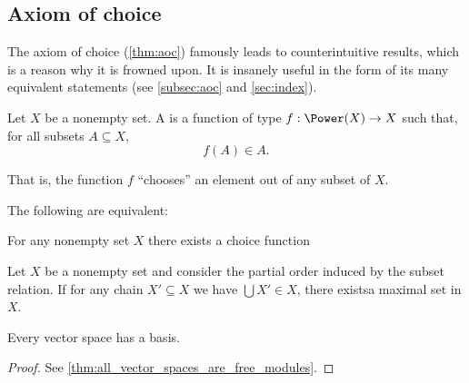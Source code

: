 \subsection{Axiom of choice}\label{subsec:axiom_of_choice}

\begin{remark}\label{remark:aoc}
  The axiom of choice (\cref{thm:aoc}) famously leads to counterintuitive results, which is a reason why it is frowned upon. It is insanely useful in the form of its many equivalent statements (see \cref{subsec:aoc} and \cref{sec:index}).
\end{remark}

\begin{definition}\label{def:choice_function}
  Let \( X \) be a nonempty set. A  is a function of type \( f: \Power(X) \to X \) such that, for all subsets \( A \subseteq X \),
  \begin{equation*}
    f(A) \in A.
  \end{equation*}

  That is, the function \( f \) \enquote{chooses} an element out of any subset of \( X \).
\end{definition}

\begin{theorem}\label{thm:aoc}
  The following are equivalent:

  \begin{thmenum}
    \cite[theorem 6M(3)]{Enderton1977} For any nonempty set \( X \) there exists a choice function

    \cite[theorem 6M(6)]{Enderton1977} Let \( X \) be a nonempty set and consider the partial order induced by the subset relation. If for any chain \( X' \subseteq X \) we have \( \bigcup X' \in X \), there exists\AOC a maximal set in \( X \).

     Every vector space has a basis.
  \end{thmenum}
\end{theorem}
\begin{proof}
   See \cref{thm:all_vector_spaces_are_free_modules}.
\end{proof}
